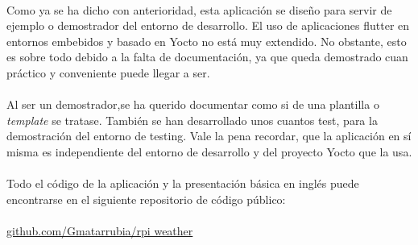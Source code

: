 \paragraph{}Como ya se ha dicho con anterioridad, esta aplicación se diseño para servir
de ejemplo o demostrador del entorno de desarrollo. El uso de aplicaciones flutter en
entornos embebidos y basado en Yocto no está muy extendido. No obstante, esto es sobre
todo debido a la falta de documentación, ya que queda demostrado cuan práctico y
conveniente puede llegar a ser.

\paragraph{}Al ser un demostrador,se ha querido documentar como si de una plantilla o
\emph{template} se tratase. También se han desarrollado unos cuantos test, para la
demostración del entorno de testing. Vale la pena recordar, que la aplicación en sí
misma es independiente del entorno de desarrollo y del proyecto Yocto que la usa.

\paragraph{}Todo el código de la aplicación y la presentación básica en inglés puede
encontrarse en el siguiente repositorio de código público:

\paragraph{}\href{https://github.com/Gmatarrubia/rpi_weather}{github.com/Gmatarrubia/rpi weather}


